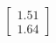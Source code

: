 \documentclass[preview]{standalone}
\begin{document}
\begin{align*}
\begin{bmatrix} 1.51 \\ 1.64 \end{bmatrix}
\end{align*}
\end{document}
